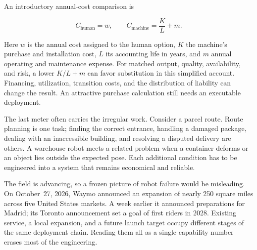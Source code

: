 \documentclass[11pt,openany]{book}
\begin{document}
An introductory annual-cost comparison is

\begin{equation}
C_{\mathrm{human}}=w,
\qquad
C_{\mathrm{machine}}=\frac{K}{L}+m.
\end{equation}

Here $w$ is the annual cost assigned to the human option, $K$ the machine's purchase and installation cost, $L$ its accounting life in years, and $m$ annual operating and maintenance expense. For matched output, quality, availability, and risk, a lower $K/L+m$ can favor substitution in this simplified account. Financing, utilization, transition costs, and the distribution of liability can change the result. An attractive purchase calculation still needs an executable deployment.

The last meter often carries the irregular work. Consider a parcel route. Route planning is one task; finding the correct entrance, handling a damaged package, dealing with an inaccessible building, and resolving a disputed delivery are others. A warehouse robot meets a related problem when a container deforms or an object lies outside the expected pose. Each additional condition has to be engineered into a system that remains economical and reliable.

The field is advancing, so a frozen picture of robot failure would be misleading. On October~27, 2026, Waymo announced an expansion of nearly 250 square miles across five United States markets. A week earlier it announced preparations for Madrid; its Toronto announcement set a goal of first riders in 2028.\cite{waymo2026expansion,waymo2026madrid,waymo2026toronto} Existing service, a local expansion, and a future launch target occupy different stages of the same deployment chain. Reading them all as a single capability number erases most of the engineering.
\end{document}
